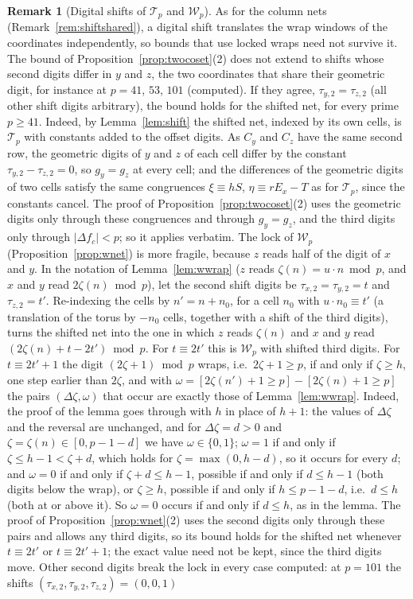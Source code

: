 \documentclass[11pt]{amsart}
\theoremstyle{definition}
\newtheorem{remark}[theorem]{Remark}
\theoremstyle{plain}
\begin{document}
\begin{remark}[Digital shifts of $\mathcal T_p$ and $\mathcal W_p$]\label{rem:wshift}
As for the column nets (Remark~\ref{rem:shiftshared}), a digital shift translates the wrap windows of the coordinates independently, so bounds that use locked wraps need not survive it. The bound of Proposition~\ref{prop:twocoset}(2) does not extend to shifts whose second digits differ in $y$ and $z$, the two coordinates that share their geometric digit, for instance at $p=41$, $53$, $101$ (computed). If they agree, $\tau_{y,2}=\tau_{z,2}$ (all other shift digits arbitrary), the bound holds for the shifted net, for every prime $p\ge41$. Indeed, by Lemma~\ref{lem:shift} the shifted net, indexed by its own cells, is $\mathcal T_p$ with constants added to the offset digits. As $C_y$ and $C_z$ have the same second row, the geometric digits of $y$ and $z$ of each cell differ by the constant $\tau_{y,2}-\tau_{z,2}=0$, so $g_y=g_z$ at every cell; and the differences of the geometric digits of two cells satisfy the same congruences $\xi\equiv hS$, $\eta\equiv rE_x-T$ as for $\mathcal T_p$, since the constants cancel. The proof of Proposition~\ref{prop:twocoset}(2) uses the geometric digits only through these congruences and through $g_y=g_z$, and the third digits only through $|\Delta f_c|<p$; so it applies verbatim. The lock of $\mathcal W_p$ (Proposition~\ref{prop:wnet}) is more fragile, because $z$ reads half of the digit of $x$ and $y$. In the notation of Lemma~\ref{lem:wwrap} ($z$ reads $\zeta(n)=u\cdot n\bmod p$, and $x$ and $y$ read $2\zeta(n)\bmod p$), let the second shift digits be $\tau_{x,2}=\tau_{y,2}=t$ and $\tau_{z,2}=t'$. Re-indexing the cells by $n'=n+n_0$, for a cell $n_0$ with $u\cdot n_0\equiv t'$ (a translation of the torus by $-n_0$ cells, together with a shift of the third digits), turns the shifted net into the one in which $z$ reads $\zeta(n)$ and $x$ and $y$ read $(2\zeta(n)+t-2t')\bmod p$. For $t\equiv2t'$ this is $\mathcal W_p$ with shifted third digits. For $t\equiv2t'+1$ the digit $(2\zeta+1)\bmod p$ wraps, i.e.\ $2\zeta+1\ge p$, if and only if $\zeta\ge h$, one step earlier than $2\zeta$, and with $\omega=[2\zeta(n')+1\ge p]-[2\zeta(n)+1\ge p]$ the pairs $(\Delta\zeta,\omega)$ that occur are exactly those of Lemma~\ref{lem:wwrap}. Indeed, the proof of the lemma goes through with $h$ in place of $h+1$: the values of $\Delta\zeta$ and the reversal are unchanged, and for $\Delta\zeta=d>0$ and $\zeta=\zeta(n)\in[0,p-1-d]$ we have $\omega\in\{0,1\}$; $\omega=1$ if and only if $\zeta\le h-1<\zeta+d$, which holds for $\zeta=\max(0,h-d)$, so it occurs for every $d$; and $\omega=0$ if and only if $\zeta+d\le h-1$, possible if and only if $d\le h-1$ (both digits below the wrap), or $\zeta\ge h$, possible if and only if $h\le p-1-d$, i.e.\ $d\le h$ (both at or above it). So $\omega=0$ occurs if and only if $d\le h$, as in the lemma. The proof of Proposition~\ref{prop:wnet}(2) uses the second digits only through these pairs and allows any third digits, so its bound holds for the shifted net whenever $t\equiv2t'$ or $t\equiv2t'+1$; the exact value need not be kept, since the third digits move. Other second digits break the lock in every case computed: at $p=101$ the shifts $(\tau_{x,2},\tau_{y,2},\tau_{z,2})=(0,0,1)$ 
\end{remark}
\end{document}
